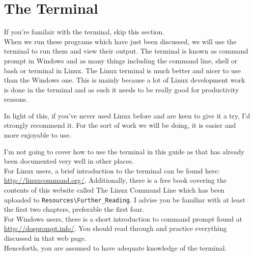 \chapter{The Terminal}
If you're familair with the terminal, skip this section.\\

When we run these programs which have just been discussed, we will use the terminal to run them and view their output. 
The terminal is known as command prompt in Windows and as many things including the command line, shell or bash or terminal in Linux.
The Linux terminal is much better and nicer to use than the Windows one. 
This is mainly because a lot of Linux development work is done in the terminal and as such it needs to be really good for productivity reasons. 

In light of this, if you've never used Linux before and are keen to give it a try, I'd strongly recommend it. For the sort of work we will be doing, it is easier and more enjoyable to use.

I'm not going to cover how to use the terminal in this guide as that has already been documented very well in other places.\\

For Linux users, a brief introduction to the terminal can be found here: \url{http://linuxcommand.org/}. Additionally, there is a free book covering the contents of this website called The Linux Command Line which has been uploaded to \verb+Resources\Further_Reading+. I advise you be familiar with at least the first two chapters, preferable the first four.\\

For Windows users, there is a short introduction to command prompt found at \url{http://dosprompt.info/}. You should read through and practice everything discussed in that web page.\\

Henceforth, you are assumed to have adequate knowledge of the terminal.

%
%

